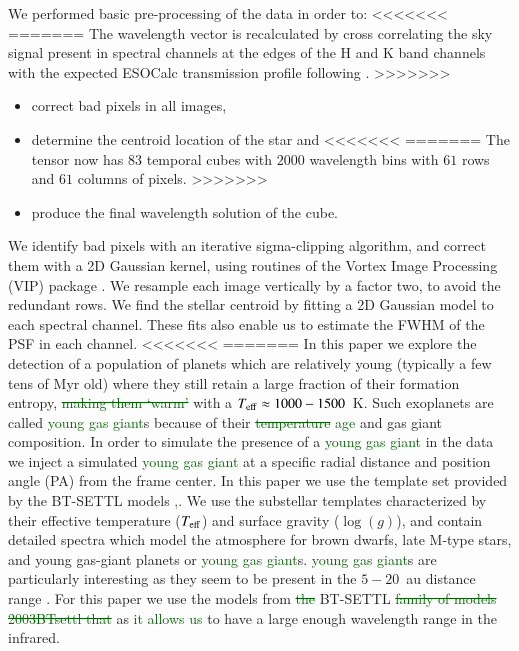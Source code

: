 \documentclass{aa}
\newcommand{\newchange}[1]{\textcolor{darkgreen}{#1}}
\begin{document}
{We performed basic pre-processing of the data in order to:
<<<<<<<
=======
The wavelength vector is recalculated by cross correlating the sky signal present in spectral channels at the edges of the H and K band channels with the expected ESOCalc transmission profile following \cite{2018AHoeijmakersMM}. 
>>>>>>>
\begin{itemize}
    \item correct bad pixels in all images,
    \item determine the centroid location of the star and
<<<<<<<
=======
The tensor now has $83$ temporal cubes with $2000$ wavelength bins with $61$ rows and $61$ columns of pixels.
>>>>>>>
    \item produce the final wavelength solution of the cube. 
\end{itemize}
We identify bad pixels with an iterative sigma-clipping algorithm, and correct them with a 2D Gaussian kernel, using routines of the Vortex Image Processing (\textsc{VIP}) package \citep{2017AJGomezVIP,2023Christiaens}.
We resample each image vertically by a factor two, to avoid the redundant rows. 
We find the stellar centroid by fitting a 2D Gaussian model to each spectral channel. 
These fits also enable us to estimate the FWHM of the PSF in each channel. 
<<<<<<<
=======
In this paper we explore the detection of a population of planets which are relatively young (typically a few tens of Myr old) where they still retain a large fraction of their formation entropy, \newchange{\sout{making them `warm'}} with a $T_{\rm eff}\approx 1000 - 1500$~K.
Such exoplanets are called \newchange{young gas giant}s because of their \newchange{\sout{temperature} age} and gas giant composition.
In order to simulate the presence of a \newchange{young gas giant} in the data we inject a simulated \newchange{young gas giant} at a specific radial distance and position angle (PA) from the frame center.
In this paper we use the template set provided by the BT-SETTL models \citep{1997Allard, 2011Allard,2003BTsettl}\newchange{,\citep[][]{2003BTsettl}}. 
We use the substellar templates characterized by their effective temperature ($T_{\rm{eff}}$) and surface gravity ($\log(g)$), and contain detailed spectra which model the atmosphere for brown dwarfs, late M-type stars, and young gas-giant planets or \newchange{young gas giant}s.
\newchange{young gas giant}s are particularly interesting as they seem to be present in the $5-20$~au distance range \cite{2016Bryan}.
For this paper we use the models from \newchange{\sout{the}} BT-SETTL \newchange{\sout{family of models 2003BTsettl that}} as \newchange{it allows us} to have a large enough wavelength range in the infrared. 
}
\end{document}
